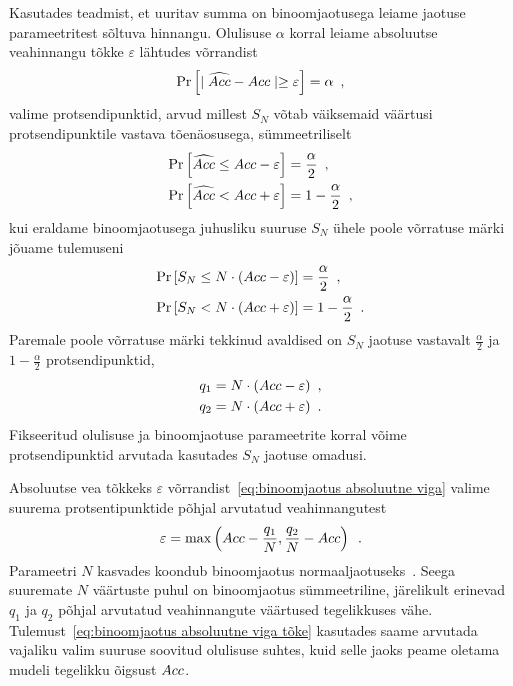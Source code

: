 Kasutades teadmist, et uuritav summa on binoomjaotusega leiame jaotuse parameetritest sõltuva hinnangu. Olulisuse $\alpha$ korral leiame absoluutse veahinnangu tõkke $\varepsilon$ lähtudes võrrandist
\begin{equation}
    \label{eq:binoomjaotus absoluutne viga}
    \Pr\left[\mid \widehat{Acc} - Acc \mid \geq \varepsilon\right] = \alpha \enspace,
\end{equation}
valime protsendipunktid, arvud millest $S_N$ võtab väiksemaid väärtusi protsendipunktile vastava tõenäosusega, sümmeetriliselt
\begin{align*}
    \Pr\left[\widehat{Acc} \leq Acc - \varepsilon\right] &= \frac{\alpha}{2} \enspace,\\
    \Pr\left[\widehat{Acc} <    Acc + \varepsilon\right] &= 1 - \frac{\alpha}{2} \enspace,
\end{align*}
kui eraldame binoomjaotusega juhusliku suuruse $S_N$ ühele poole võrratuse märki jõuame tulemuseni
\begin{align*}
    \Pr\left[S_N \leq N \cdot (Acc - \varepsilon)\right] &= \frac{\alpha}{2} \enspace,\\
    \Pr\left[S_N < N \cdot (Acc + \varepsilon)\right] &= 1 - \frac{\alpha}{2} \enspace.
\end{align*}
Paremale poole võrratuse märki tekkinud avaldised on $S_N$ jaotuse vastavalt $\frac{\alpha}{2}$ ja $1-\frac{\alpha}{2}$ protsendipunktid, 
\begin{align*}
    q_1 &= N \cdot(Acc-\varepsilon) \enspace, \\
    q_2 &= N \cdot(Acc+\varepsilon) \enspace. \\
\end{align*}
Fikseeritud olulisuse ja binoomjaotuse parameetrite korral võime protsendipunktid arvutada kasutades $S_N$ jaotuse omadusi. 

Absoluutse vea tõkkeks $\varepsilon$ võrrandist~\eqref{eq:binoomjaotus absoluutne viga} valime suurema protsentipunktide põhjal arvutatud veahinnangutest
\begin{equation}
    \label{eq:binoomjaotus absoluutne viga tõke}
    \varepsilon = \max \left( Acc - \frac{q_1}{N} , \frac{q_2}{N} - Acc \right) \enspace.
\end{equation}
Parameetri $N$ kasvades koondub binoomjaotus normaaljaotuseks~\cite{tõenäosusteooria-algkursus}. Seega suuremate $N$ väärtuste puhul on binoomjaotus sümmeetriline, järelikult erinevad $q_1$ ja $q_2$ põhjal arvutatud veahinnangute väärtused tegelikkuses vähe. Tulemust~\eqref{eq:binoomjaotus absoluutne viga tõke} kasutades saame arvutada vajaliku valim suuruse soovitud olulisuse suhtes, kuid selle jaoks peame oletama mudeli tegelikku õigsust $Acc$.

